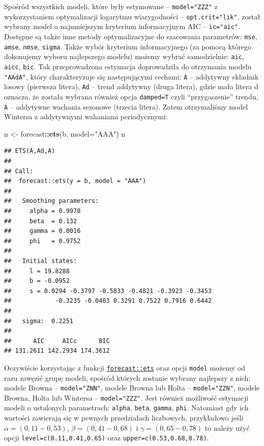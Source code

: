 \documentclass[polish,]{book}
\newenvironment{Shaded}{\begin{snugshade}}{\end{snugshade}}
\newcommand{\DataTypeTok}[1]{\textcolor[rgb]{0.13,0.29,0.53}{#1}}
\newcommand{\KeywordTok}[1]{\textcolor[rgb]{0.13,0.29,0.53}{\textbf{#1}}}
\newcommand{\NormalTok}[1]{#1}
\newcommand{\OperatorTok}[1]{\textcolor[rgb]{0.81,0.36,0.00}{\textbf{#1}}}
\newcommand{\StringTok}[1]{\textcolor[rgb]{0.31,0.60,0.02}{#1}}
\begin{document}
Spośród wszystkich modeli, które były estymowane -- \texttt{model="ZZZ"} z wykorzystaniem optymalizacji logarytmu wiarygodności -- \texttt{opt.crit="lik"}, został wybrany
model o najmniejszym kryterium informacyjnym AIC -- \texttt{ic="aic"}. Dostępne są
także inne metody optymalizacyjne do szacowania parametrów: \texttt{mse}, \texttt{amse}, \texttt{nmse},
\texttt{sigma}. Także wybór kryterium informacyjnego (za pomocą którego dokonujemy
wyboru najlepszego modelu) możemy wybrać samodzielnie: \texttt{aic}, \texttt{aicc}, \texttt{bic}. Tak
przeprowadzona estymacja doprowadziła do otrzymania modelu \texttt{"AAdA"}, który charakteryzuje się następującymi cechami: \texttt{A} -- addytywny składnik losowy (pierwsza
litera), \texttt{Ad} -- trend addytywny (druga litera), gdzie mała litera d oznacza, że została wybrana również opcja \texttt{damped=T} czyli ``przygaszenie'' trendu, \texttt{A} -- addytywne
wachania sezonowe (trzecia litera). Zatem otrzymaliśmy model Wintersa z addytywnymi wahaniami periodycznymi:

\begin{Shaded}
\begin{Highlighting}[]
\NormalTok{n <-}\StringTok{ }\NormalTok{forecast}\OperatorTok{::}\KeywordTok{ets}\NormalTok{(b, }\DataTypeTok{model=}\StringTok{"AAA"}\NormalTok{)}
\NormalTok{n}
\end{Highlighting}
\end{Shaded}

\begin{verbatim}
## ETS(A,Ad,A) 
## 
## Call:
##  forecast::ets(y = b, model = "AAA") 
## 
##   Smoothing parameters:
##     alpha = 0.9978 
##     beta  = 0.132 
##     gamma = 0.0016 
##     phi   = 0.9752 
## 
##   Initial states:
##     l = 19.8288 
##     b = -0.0952 
##     s = 0.0294 -0.3797 -0.5833 -0.4821 -0.3923 -0.3453
##            -0.3235 -0.0403 0.3291 0.7522 0.7916 0.6442
## 
##   sigma:  0.2251
## 
##      AIC     AICc      BIC 
## 131.2611 142.2934 174.3612
\end{verbatim}

Oczywiście korzystając z funkcji \href{https://rdrr.io/cran/forecast/man/ets.html}{\texttt{forecast::ets}} oraz opcji \texttt{model} możemy od razu zawęzić
grupę modeli, spośród których zostanie wybrany najlepszy z nich: modele Browna
-- \texttt{model="ZNN"}, modele Browna lub Holta -- \texttt{model="ZZN"}, modele Browna, Holta
lub Wintersa -- \texttt{model="ZZZ"}. Jest również możliwość estymacji modeli o ustalonych
parametrach: \texttt{alpha}, \texttt{beta}, \texttt{gamma}, \texttt{phi}. Natomiast gdy ich wartości zawierają się
w pewnych przedziałach liczbowych, przykładowo jeśli \(\alpha = (0,11 - 0,53)\), \(\beta = (0,41 - 0,68)\) i \(\gamma = (0,65 - 0,78)\) to należy użyć opcji \texttt{level=c(0.11,0.41,0.65)} oraz \texttt{upper=c(0.53,0.68,0.78)}.
\end{document}
